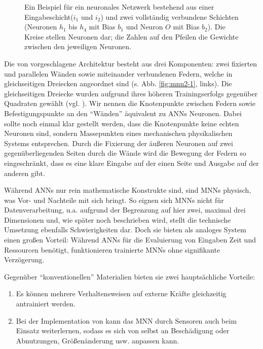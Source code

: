 \begin{figure}[H]
{
    }
    \caption{Ein Beispiel für ein neuronales Netzwerk bestehend aus einer Eingabeschicht($i_1$ und $i_2$) und zwei vollständig verbundene Schichten (Neuronen $h_1$ bis $h_4$ mit Bias $b_1$ und Neuron $O$ mit Bias $b_2$). 
    Die Kreise stellen Neuronen dar; die Zahlen auf den Pfeilen die Gewichte zwischen den jeweiligen Neuronen.}
    \label{fig:dense_nn}
\end{figure}

Die von \lee{} vorgeschlagene Architektur besteht aus drei Komponenten: zwei fixierten und parallelen Wänden sowie miteinander verbundenen Federn, welche in gleichseitigen Dreiecken angeordnet sind  (s. Abb. \ref{fig:mnn2-1}, links).
Die gleichseitigen Dreiecke wurden aufgrund ihres höheren Trainingserfolgs gegenüber Quadraten gewählt (vgl. \cite[Abb. 5]{Lee2022}).
Wir nennen die Knotenpunkte zwischen Federn sowie Befestigungspunkte an den \enquote{Wänden} äquivalent zu ANNs Neuronen.
Dabei sollte noch einmal klar gestellt werden, dass die Knotenpunkte keine echten Neuronen sind, sondern Massepunkten eines mechanischen physikalischen Systems entsprechen.
Durch die Fixierung der äußeren Neuronen auf zwei gegenüberliegenden Seiten durch die Wände wird die Bewegung der Federn so eingeschränkt, dass es eine klare Eingabe auf der einen Seite und Ausgabe auf der anderen gibt.

Während ANNs nur rein mathematische Konstrukte sind, sind MNNs physisch, was Vor- und Nachteile mit sich bringt. 
So eignen sich MNNs nicht für Datenverarbeitung, u.a. aufgrund der Begrenzung auf hier zwei, maximal drei Dimensionen und, wie später noch beschrieben wird, stellt die technische Umsetzung ebenfalls Schwierigkeiten dar.
Doch sie bieten als analoges System einen großen Vorteil: Während ANNs für die Evaluierung von Eingaben Zeit und Ressourcen benötigt, funktionieren trainierte MNNs ohne signifikante Verzögerung.

Gegenüber \enquote{konventionellen} Materialien bieten sie zwei hauptsächliche Vorteile:

\begin{enumerate}
    \item Es können mehrere Verhaltensweisen auf externe Kräfte gleichzeitig antrainiert werden.
    \item Bei der Implementation von \lee{} kann das MNN durch Sensoren auch beim Einsatz weiterlernen, sodass es sich von selbst an Beschädigung oder Abnutzungen, Größenänderung usw. anpassen kann.
\end{enumerate}

